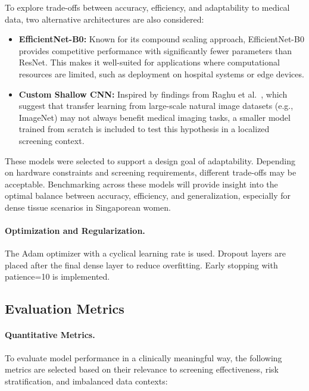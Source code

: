 \documentclass[12pt]{article}
\begin{document}
To explore trade-offs between accuracy, efficiency, and adaptability to medical data, two alternative architectures are also considered:

\begin{itemize}
    \item \textbf{EfficientNet-B0:} Known for its compound scaling approach, EfficientNet-B0 provides competitive performance with significantly fewer parameters than ResNet. This makes it well-suited for applications where computational resources are limited, such as deployment on hospital systems or edge devices.
    
    \item \textbf{Custom Shallow CNN:} Inspired by findings from Raghu et al.~\cite{2}, which suggest that transfer learning from large-scale natural image datasets (e.g., ImageNet) may not always benefit medical imaging tasks, a smaller model trained from scratch is included to test this hypothesis in a localized screening context.
\end{itemize}

These models were selected to support a design goal of adaptability. Depending on hardware constraints and screening requirements, different trade-offs may be acceptable. Benchmarking across these models will provide insight into the optimal balance between accuracy, efficiency, and generalization, especially for dense tissue scenarios in Singaporean women.

\paragraph{Optimization and Regularization.}
The Adam optimizer with a cyclical learning rate is used. Dropout layers are placed after the final dense layer to reduce overfitting. Early stopping with patience=10 is implemented.

\vspace{1em}

\subsection{Evaluation Metrics}

\paragraph{Quantitative Metrics.}
To evaluate model performance in a clinically meaningful way, the following metrics are selected based on their relevance to screening effectiveness, risk stratification, and imbalanced data contexts:
\end{document}
